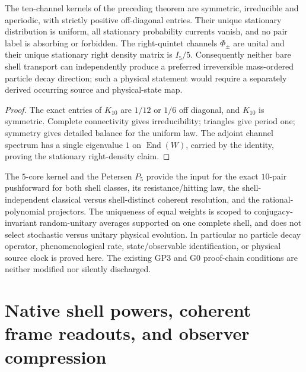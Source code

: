 \documentclass[11pt]{article}
\begin{document}
\begin{corollary}
\label{p1b:cor:two-shell-bare-arrow-no-go}
The ten-channel kernels of the preceding theorem are symmetric,
irreducible and aperiodic, with strictly positive off-diagonal entries.
Their unique stationary distribution is uniform, all stationary
probability currents vanish, and no pair label is absorbing or forbidden.
The right-quintet channels $\Phi_\pm$ are unital and their unique
stationary right density matrix is $I_5/5$.  Consequently neither bare
shell transport can independently produce a preferred irreversible
mass-ordered particle decay direction; such a physical statement would
require a separately derived occurring source and physical-state map.
\end{corollary}
\begin{proof}
The exact entries of $K_{10}$ are $1/12$ or $1/6$ off diagonal, and
$K_{10}$ is symmetric.  Complete connectivity gives irreducibility;
triangles give period one; symmetry gives detailed balance for the
uniform law.  The adjoint channel spectrum has a single eigenvalue
$1$ on $\operatorname{End}(W)$, carried by the identity, proving the
stationary right-density claim.
\end{proof}

\begin{remark}
The $5$-core kernel and the Petersen $P_5$ provide the input for the exact
$10$-pair pushforward for both shell classes, its resistance/hitting law,
the shell-independent classical versus shell-distinct coherent resolution,
and the rational-polynomial projectors.  The uniqueness of equal weights
is scoped to conjugacy-invariant random-unitary averages supported on
one complete shell, and does not select stochastic versus unitary
physical evolution.  In particular no particle decay operator,
phenomenological rate, state/observable identification, or physical
source clock is proved here.  The existing GP3 and G0 proof-chain
conditions are neither modified nor silently discharged.
\end{remark}

\section{Native shell powers, coherent frame readouts, and observer compression}
\label{p1b:sec:single-shell-readout-proposal}
\end{document}
